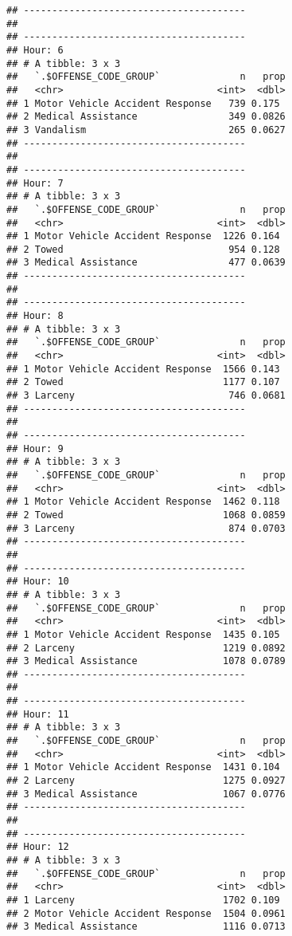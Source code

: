\documentclass[]{article}
\begin{document}
\begin{verbatim}
## ---------------------------------------
## 
## ---------------------------------------
## Hour: 6
## # A tibble: 3 x 3
##   `.$OFFENSE_CODE_GROUP`              n   prop
##   <chr>                           <int>  <dbl>
## 1 Motor Vehicle Accident Response   739 0.175 
## 2 Medical Assistance                349 0.0826
## 3 Vandalism                         265 0.0627
## ---------------------------------------
## 
## ---------------------------------------
## Hour: 7
## # A tibble: 3 x 3
##   `.$OFFENSE_CODE_GROUP`              n   prop
##   <chr>                           <int>  <dbl>
## 1 Motor Vehicle Accident Response  1226 0.164 
## 2 Towed                             954 0.128 
## 3 Medical Assistance                477 0.0639
## ---------------------------------------
## 
## ---------------------------------------
## Hour: 8
## # A tibble: 3 x 3
##   `.$OFFENSE_CODE_GROUP`              n   prop
##   <chr>                           <int>  <dbl>
## 1 Motor Vehicle Accident Response  1566 0.143 
## 2 Towed                            1177 0.107 
## 3 Larceny                           746 0.0681
## ---------------------------------------
## 
## ---------------------------------------
## Hour: 9
## # A tibble: 3 x 3
##   `.$OFFENSE_CODE_GROUP`              n   prop
##   <chr>                           <int>  <dbl>
## 1 Motor Vehicle Accident Response  1462 0.118 
## 2 Towed                            1068 0.0859
## 3 Larceny                           874 0.0703
## ---------------------------------------
## 
## ---------------------------------------
## Hour: 10
## # A tibble: 3 x 3
##   `.$OFFENSE_CODE_GROUP`              n   prop
##   <chr>                           <int>  <dbl>
## 1 Motor Vehicle Accident Response  1435 0.105 
## 2 Larceny                          1219 0.0892
## 3 Medical Assistance               1078 0.0789
## ---------------------------------------
## 
## ---------------------------------------
## Hour: 11
## # A tibble: 3 x 3
##   `.$OFFENSE_CODE_GROUP`              n   prop
##   <chr>                           <int>  <dbl>
## 1 Motor Vehicle Accident Response  1431 0.104 
## 2 Larceny                          1275 0.0927
## 3 Medical Assistance               1067 0.0776
## ---------------------------------------
## 
## ---------------------------------------
## Hour: 12
## # A tibble: 3 x 3
##   `.$OFFENSE_CODE_GROUP`              n   prop
##   <chr>                           <int>  <dbl>
## 1 Larceny                          1702 0.109 
## 2 Motor Vehicle Accident Response  1504 0.0961
## 3 Medical Assistance               1116 0.0713

\end{verbatim}
\end{document}
